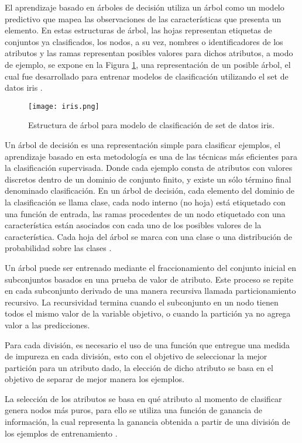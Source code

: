 El aprendizaje basado en árboles de decisión utiliza un árbol como un modelo predictivo que mapea las observaciones de las características que presenta un elemento. En estas estructuras de árbol, las hojas representan etiquetas de conjuntos ya clasificados, los nodos, a su vez, nombres o identificadores de los atributos y las ramas representan posibles valores para dichos atributos, a modo de ejemplo, se expone en la Figura \ref{arboles}, una representación de un posible árbol, el cual fue desarrollado para entrenar modelos de clasificación utilizando el set de datos iris \cite{fisher1936use}.

\begin{figure}[!h]
	
	\centering
	\texttt{[image: iris.png]}
	\caption{Estructura de árbol para modelo de clasificación de set de datos iris.}
	\label{arboles}
\end{figure}

Un árbol de decisión es una representación simple para clasificar ejemplos, el aprendizaje basado en esta metodología es una de las técnicas más eficientes para la clasificación supervisada. Donde cada ejemplo consta de atributos con valores discretos dentro de un dominio de conjunto finito, y existe un sólo término final denominado clasificación. En un árbol de decisión, cada elemento del dominio de la clasificación se llama clase, cada nodo interno (no hoja) está etiquetado con una función de entrada, las ramas procedentes de un nodo etiquetado con una característica están asociados con cada uno de los posibles valores de la característica. Cada hoja del árbol se marca con una clase o una distribución de probabilidad sobre las clases \cite{bhargava2013decision}.

Un árbol puede ser entrenado mediante el fraccionamiento del conjunto inicial en subconjuntos basados en una prueba de valor de atributo. Este proceso se repite en cada subconjunto derivado de una manera recursiva llamada particionamiento recursivo. La recursividad termina cuando el subconjunto en un nodo tienen todos el mismo valor de la variable objetivo, o cuando la partición ya no agrega valor a las predicciones.

Para cada división, es necesario el uso de una función que entregue una medida de impureza en cada división, esto con el objetivo de seleccionar la mejor partición para un atributo dado, la elección de dicho atributo se basa en el objetivo de separar de mejor manera los ejemplos. 

La selección de los atributos se basa en qué atributo al momento de clasificar genera nodos más puros, para ello se utiliza una función de ganancia de información, la cual representa la ganancia  obtenida a partir de una división de los ejemplos de entrenamiento \cite{breiman2017classification}. 

